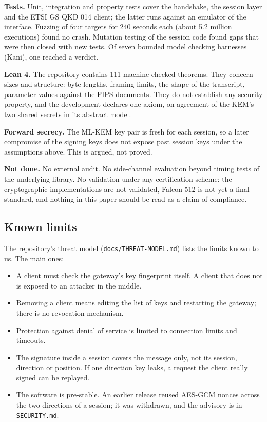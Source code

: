 \documentclass[11pt,letterpaper]{article}
\begin{document}
\textbf{Tests.} Unit, integration and property tests cover the handshake, the session layer and the ETSI GS QKD 014 client; the latter runs against an emulator of the interface. Fuzzing of four targets for 240 seconds each (about 5.2 million executions) found no crash. Mutation testing of the session code found gaps that were then closed with new tests. Of seven bounded model checking harnesses (Kani), one reached a verdict.

\textbf{Lean 4.} The repository contains 111 machine-checked theorems. They concern sizes and structure: byte lengths, framing limits, the shape of the transcript, parameter values against the FIPS documents. They do not establish any security property, and the development declares one axiom, on agreement of the KEM's two shared secrets in its abstract model.

\textbf{Forward secrecy.} The ML-KEM key pair is fresh for each session, so a later compromise of the signing keys does not expose past session keys under the assumptions above. This is argued, not proved.

\textbf{Not done.} No external audit. No side-channel evaluation beyond timing tests of the underlying library. No validation under any certification scheme: the cryptographic implementations are not validated, Falcon-512 is not yet a final standard, and nothing in this paper should be read as a claim of compliance.

\subsection{Known limits}

The repository's threat model (\texttt{docs/THREAT-MODEL.md}) lists the limits known to us. The main ones:

\begin{itemize}
    \item A client must check the gateway's key fingerprint itself. A client that does not is exposed to an attacker in the middle.
    \item Removing a client means editing the list of keys and restarting the gateway; there is no revocation mechanism.
    \item Protection against denial of service is limited to connection limits and timeouts.
    \item The signature inside a session covers the message only, not its session, direction or position. If one direction key leaks, a request the client really signed can be replayed.
    \item The software is pre-stable. An earlier release reused AES-GCM nonces across the two directions of a session; it was withdrawn, and the advisory is in \texttt{SECURITY.md}.
\end{itemize}
\end{document}
